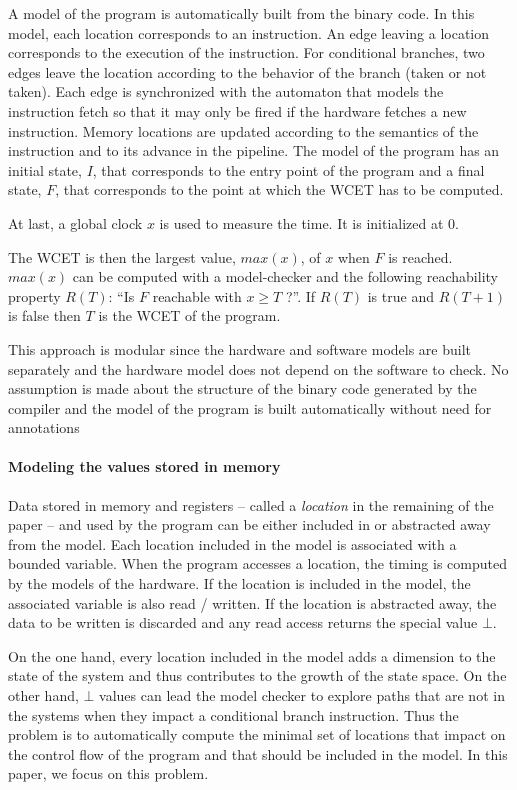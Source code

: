   A model of the program is automatically built from the binary code. In this
  model, each location corresponds to an instruction. An edge leaving a location
  corresponds to the execution of the instruction. For conditional branches, two
  edges leave the location according to the behavior of the branch (taken or not
  taken). Each edge is synchronized with the automaton that models the
  instruction fetch so that it may only be fired if the hardware fetches a new
  instruction. Memory locations are updated according to the semantics of the
  instruction and to its advance in the pipeline. The model of the program has
  an initial state, $I$, that corresponds to the entry point of the program and
  a final state, $F$, that corresponds to the point at which the WCET has to be
  computed.

  At last, a global clock $x$ is used to measure the time. It is initialized at
  0.

  The WCET is then the largest value, $max(x)$, of $x$ when $F$ is
  reached. $max(x)$ can be computed with a model-checker and the following
  reachability property $R(T)$: ``Is $F$ reachable with $x \geq T$ ?''. If
  $R(T)$ is true and $R(T+1)$ is false then $T$ is the WCET of the program.

  This approach is modular since the hardware and software models are built
  separately and the hardware model does not depend on the software to check. No
  assumption is made about the structure of the binary code generated by the
  compiler and the model of the program is built automatically without need for
  annotations

  \paragraph*{Modeling the values stored in memory}

  Data stored in memory and registers -- called a {\it location} in the
  remaining of the paper -- and used by the program can be either included in or
  abstracted away from the model.  Each location included in the model is
  associated with a bounded variable.  When the program accesses a location, the
  timing is computed by the models of the hardware.  If the location is included
  in the model, the associated variable is also read / written.  If the location
  is abstracted away, the data to be written is discarded and any read access
  returns the special value $\bot$.

  On the one hand, every location included in the model adds a dimension to the
  state of the system and thus contributes to the growth of the state space.  On
  the other hand, $\bot$ values can lead the model checker to explore paths that
  are not in the systems when they impact a conditional branch instruction.
  Thus the problem is to automatically compute the minimal set of locations that
  impact on the control flow of the program and that should be included in the
  model.  In this paper, we focus on this problem.

